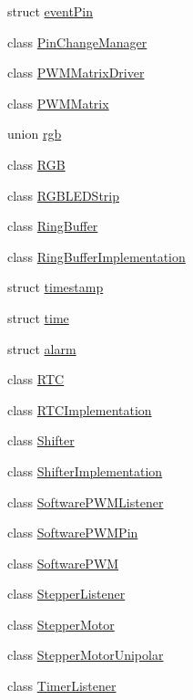 \begin{DoxyCompactItemize}
\item 
struct \hyperlink{structflame_1_1event_pin}{event\-Pin}
\item 
class \hyperlink{classflame_1_1_pin_change_manager}{Pin\-Change\-Manager}
\item 
class \hyperlink{classflame_1_1_p_w_m_matrix_driver}{P\-W\-M\-Matrix\-Driver}
\item 
class \hyperlink{classflame_1_1_p_w_m_matrix}{P\-W\-M\-Matrix}
\item 
union \hyperlink{unionflame_1_1rgb}{rgb}
\item 
class \hyperlink{classflame_1_1_r_g_b}{R\-G\-B}
\item 
class \hyperlink{classflame_1_1_r_g_b_l_e_d_strip}{R\-G\-B\-L\-E\-D\-Strip}
\item 
class \hyperlink{classflame_1_1_ring_buffer}{Ring\-Buffer}
\item 
class \hyperlink{classflame_1_1_ring_buffer_implementation}{Ring\-Buffer\-Implementation}
\item 
struct \hyperlink{structflame_1_1timestamp}{timestamp}
\item 
struct \hyperlink{structflame_1_1time}{time}
\item 
struct \hyperlink{structflame_1_1alarm}{alarm}
\item 
class \hyperlink{classflame_1_1_r_t_c}{R\-T\-C}
\item 
class \hyperlink{classflame_1_1_r_t_c_implementation}{R\-T\-C\-Implementation}
\item 
class \hyperlink{classflame_1_1_shifter}{Shifter}
\item 
class \hyperlink{classflame_1_1_shifter_implementation}{Shifter\-Implementation}
\item 
class \hyperlink{classflame_1_1_software_p_w_m_listener}{Software\-P\-W\-M\-Listener}
\item 
class \hyperlink{classflame_1_1_software_p_w_m_pin}{Software\-P\-W\-M\-Pin}
\item 
class \hyperlink{classflame_1_1_software_p_w_m}{Software\-P\-W\-M}
\item 
class \hyperlink{classflame_1_1_stepper_listener}{Stepper\-Listener}
\item 
class \hyperlink{classflame_1_1_stepper_motor}{Stepper\-Motor}
\item 
class \hyperlink{classflame_1_1_stepper_motor_unipolar}{Stepper\-Motor\-Unipolar}
\item 
class \hyperlink{classflame_1_1_timer_listener}{Timer\-Listener}
\item 

\end{DoxyCompactItemize}
